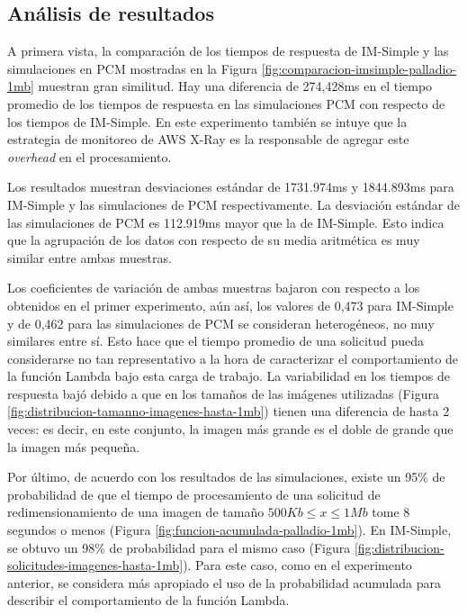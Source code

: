 \subsection{Análisis de resultados}
A primera vista, la comparación de los tiempos de respuesta de IM-Simple y las simulaciones en PCM mostradas en la Figura \ref{fig:comparacion-imsimple-palladio-1mb} muestran gran similitud. Hay una diferencia de 274,428ms en el tiempo promedio de los tiempos de respuesta en las simulaciones PCM con respecto de los tiempos de IM-Simple. En este experimento también se intuye que la estrategia de monitoreo de AWS X-Ray es la responsable de agregar este \emph{overhead} en el procesamiento.

Los resultados muestran desviaciones estándar de 1731.974ms y 1844.893ms para IM-Simple y las simulaciones de PCM respectivamente. La desviación estándar de las simulaciones de PCM es 112.919ms mayor que la de IM-Simple. Esto indica que la agrupación de los datos con respecto de su media aritmética es muy similar entre ambas muestras.

Los coeficientes de variación de ambas muestras bajaron con respecto a los obtenidos en el primer experimento, aún así, los valores de 0,473 para IM-Simple y de 0,462 para las simulaciones de PCM se consideran heterogéneos, no muy similares entre sí. Esto hace que el tiempo promedio de una solicitud pueda considerarse no tan representativo a la hora de caracterizar el comportamiento de la función Lambda bajo esta carga de trabajo. La variabilidad en los tiempos de respuesta bajó debido a que en los tamaños de las imágenes utilizadas (Figura \ref{fig:distribucion-tamanno-imagenes-hasta-1mb}) tienen una diferencia de hasta 2 veces: es decir, en este conjunto, la imagen más grande es el doble de grande que la imagen más pequeña.

Por último, de acuerdo con los resultados de las simulaciones, existe un 95\% de probabilidad de que el tiempo de procesamiento de una solicitud de redimensionamiento de una imagen de tamaño $500Kb \leq x \leq 1Mb$ tome 8 segundos o menos (Figura \ref{fig:funcion-acumulada-palladio-1mb}). En IM-Simple, se obtuvo un 98\% de probabilidad para el mismo caso (Figura \ref{fig:distribucion-solicitudes-imagenes-hasta-1mb}). Para este caso, como en el experimento anterior, se considera más apropiado el uso de la probabilidad acumulada para describir el comportamiento de la función Lambda.

